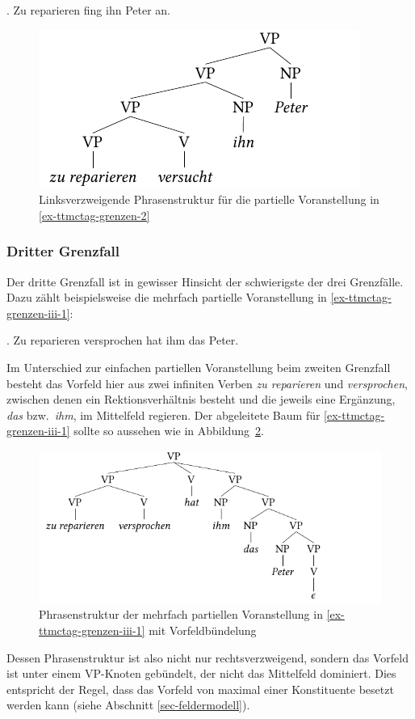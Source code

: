 \ex. Zu reparieren fing ihn Peter an. \label{ex-ttmctag-grenzen-ii-3}

\begin{figure}[t]
\centering
\includegraphics{graphics/abb735.pdf}
\caption{\label{fig-ttmctag-ii-5}Linksverzweigende Phrasenstruktur für die partielle Voranstellung in \ref{ex-ttmctag-grenzen-2} }
\end{figure}  




\subsubsection*{Dritter Grenzfall}

Der dritte Grenzfall ist in gewisser Hinsicht der schwierigste der drei Grenzfälle. Dazu zählt beispielsweise die mehrfach partielle Voranstellung in \ref{ex-ttmctag-grenzen-iii-1}: 

\ex. Zu reparieren versprochen hat ihm das Peter. \label{ex-ttmctag-grenzen-iii-1}

Im Unterschied zur einfachen partiellen Voranstellung beim zweiten Grenzfall besteht das Vorfeld hier aus zwei infiniten Verben {\it zu reparieren} und {\it versprochen}, zwischen denen ein Rektionsverhältnis besteht und die jeweils eine Ergänzung, {\it das} bzw.\ {\it ihm}, im Mittelfeld regieren. Der abgeleitete Baum für \ref{ex-ttmctag-grenzen-iii-1} sollte so aussehen wie in Abbildung~\ref{fig-ttmctag-grenzen-iii}. 
\begin{figure}[t]
\centering
\includegraphics{graphics/abb736.pdf}
\caption{\label{fig-ttmctag-grenzen-iii}Phrasenstruktur der mehrfach partiellen Voranstellung in \ref{ex-ttmctag-grenzen-iii-1} mit Vor\-feld\-bündelung}
\end{figure}
Dessen Phrasenstruktur ist also nicht nur rechtsverzweigend, sondern das Vorfeld ist unter einem VP-Knoten gebündelt, der nicht das Mittelfeld dominiert. Dies entspricht der Regel, dass das Vorfeld von maximal einer Konstituente besetzt werden kann (siehe Abschnitt \ref{sec-feldermodell}).    

